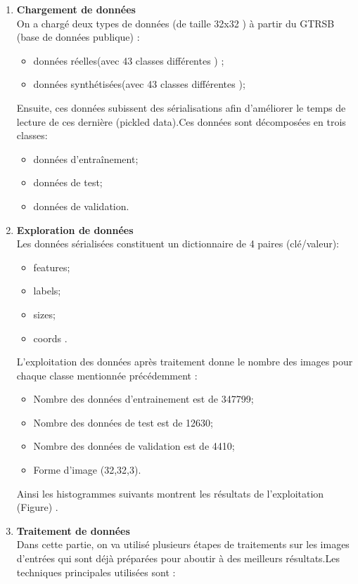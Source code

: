 \begin{enumerate}
    \item {\textbf{Chargement de données}}\\
    On a chargé deux types de données (de taille 32x32 ) à partir du GTRSB (base de données publique) :
    \begin{itemize}
        \item données réelles(avec 43 classes différentes ) ;
        \item données synthétisées(avec 43 classes différentes );
    \end{itemize}
    Ensuite, ces données subissent des sérialisations afin d’améliorer le temps de lecture de ces dernière (pickled data).Ces données sont décomposées en trois classes:
    \begin{itemize}
        \item données d'entraînement;
        \item données de test;
        \item données de validation.
    \end{itemize}
  \item {\textbf{Exploration de données}}\\
    Les données sérialisées constituent un dictionnaire de 4 paires (clé/valeur):
     \begin{itemize}
        \item features;
        \item labels;
        \item sizes;
        \item coords .
    \end{itemize}
    L'exploitation des données après traitement donne le nombre des images pour chaque classe mentionnée précédemment :
    \begin{itemize}
        \item Nombre des données d'entrainement est de 347799;
        \item Nombre des données de test est de 12630;
        \item Nombre des données de validation est de 4410;
        \item Forme d'image (32,32,3).
    \end{itemize}
    Ainsi les histogrammes suivants montrent les résultats de l'exploitation (Figure) .
    \item {\textbf{Traitement de données}}\\
    Dans cette partie, on va utilisé plusieurs étapes de traitements sur les images d'entrées qui sont déjà préparées pour aboutir à des meilleurs résultats.Les techniques principales utilisées sont :

\end{enumerate}
